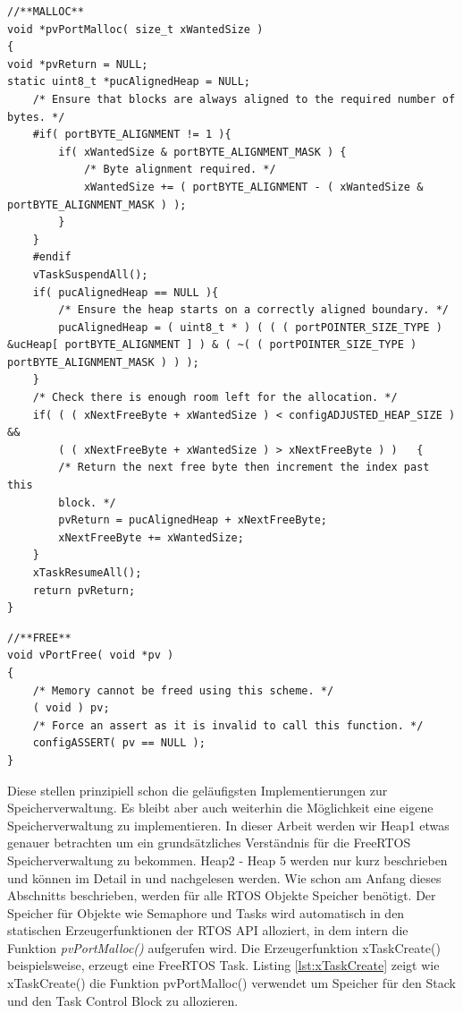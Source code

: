 \begin{lstlisting}[caption={FreeRTOS Source von pvPortMalloc() aus Heap1.c. Zuerst wird sichergestellt das die Startspeicheradresse dem byte-Alignment des uProzessors entspricht. Der STM32F4 ist ein 32Bit uProzessor und hat ein byte-Alignment von 4, so dass die Startadresse immer eine Potenz von 4 sein muss. Danach wird der Scheduler deaktiviert und geprüft ob genug Speicher zur Verfügung steht. Abschließend wird der Speicher im ucHeap reserviert.  }, linewidth=8cm,captionpos=b, label=lst:malloc2, float=hbt]
//**MALLOC**
void *pvPortMalloc( size_t xWantedSize )
{
void *pvReturn = NULL;
static uint8_t *pucAlignedHeap = NULL;
	/* Ensure that blocks are always aligned to the required number of bytes. */
	#if( portBYTE_ALIGNMENT != 1 ){
		if( xWantedSize & portBYTE_ALIGNMENT_MASK )	{
			/* Byte alignment required. */
			xWantedSize += ( portBYTE_ALIGNMENT - ( xWantedSize & portBYTE_ALIGNMENT_MASK ) );
		}
	}
	#endif
	vTaskSuspendAll();
	if( pucAlignedHeap == NULL ){
		/* Ensure the heap starts on a correctly aligned boundary. */
		pucAlignedHeap = ( uint8_t * ) ( ( ( portPOINTER_SIZE_TYPE ) &ucHeap[ portBYTE_ALIGNMENT ] ) & ( ~( ( portPOINTER_SIZE_TYPE ) portBYTE_ALIGNMENT_MASK ) ) );
	}
	/* Check there is enough room left for the allocation. */
	if( ( ( xNextFreeByte + xWantedSize ) < configADJUSTED_HEAP_SIZE ) &&
		( ( xNextFreeByte + xWantedSize ) > xNextFreeByte )	)	{
		/* Return the next free byte then increment the index past this
		block. */
		pvReturn = pucAlignedHeap + xNextFreeByte;
		xNextFreeByte += xWantedSize;
	}
	xTaskResumeAll();
	return pvReturn;
}
\end{lstlisting}
\begin{lstlisting}[caption={FreeRTOS Source von vPortFree() aus Heap1.c . Da eine Speicherfreigabe in Heap1 nicht vorgesehen ist, ist diese Funktion leer.}, linewidth=8cm,captionpos=b, label=lst:free2, float=hbt]
//**FREE**
void vPortFree( void *pv )
{
	/* Memory cannot be freed using this scheme. */
	( void ) pv;
	/* Force an assert as it is invalid to call this function. */
	configASSERT( pv == NULL );
}
\end{lstlisting} 
Diese stellen prinzipiell schon die ge\-läu\-figsten Implementierungen zur Speicherverwaltung. Es bleibt aber auch weiterhin die Möglichkeit eine eigene Speicherverwaltung zu implementieren. In dieser Arbeit werden wir Heap1 etwas genauer betrachten um ein grund\-sätz\-liches Verständnis für die FreeRTOS Speicherverwaltung zu bekommen. Heap2 - Heap 5 werden nur kurz beschrieben und können im Detail in \cite{MasteringFreeRtos} und \cite{FreeRtosAdvanced} nachgelesen werden. Wie schon am Anfang dieses Abschnitts beschrieben, werden für alle RTOS Objekte Speicher benötigt. Der Speicher für Objekte wie Semaphore und Tasks wird automatisch in den statischen Erzeugerfunktionen der RTOS API alloziert, in dem intern die Funktion \textit{pvPortMalloc()} aufgerufen wird. Die Erzeugerfunktion xTaskCreate() beispielsweise, erzeugt eine FreeRTOS Task. Listing \ref{lst:xTaskCreate} zeigt wie xTaskCreate() die Funktion pvPortMalloc() verwendet um Speicher für den Stack und den Task Control Block zu allozieren.
